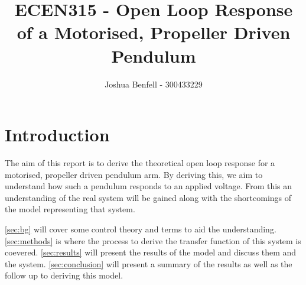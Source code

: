 \documentclass[a4paper, 11pt, compsoc]{IEEEtran}
\title{ECEN315 - Open Loop Response of a Motorised, Propeller Driven Pendulum}
\author{Joshua Benfell - 300433229}
\begin{document}
    \maketitle
    \IEEEdisplaynontitleabstractindextext

    \section{Introduction}\label{sec:intro}
        The aim of this report is to derive the theoretical open loop response for a motorised, propeller driven pendulum arm. By deriving this, we aim to understand how such a pendulum responds to an applied voltage. From this an understanding of the real system will be gained along with the shortcomings of the model representing that system.
        \par
        \cref{sec:bg} will cover some control theory and terms to aid the understanding. \cref{sec:methods} is where the process to derive the transfer function of this system is coevered. \cref{sec:results} will present the results of the model and discuss them and the system. \cref{sec:conclusion} will present a summary of the results as well as the follow up to deriving this model.
\end{document}
